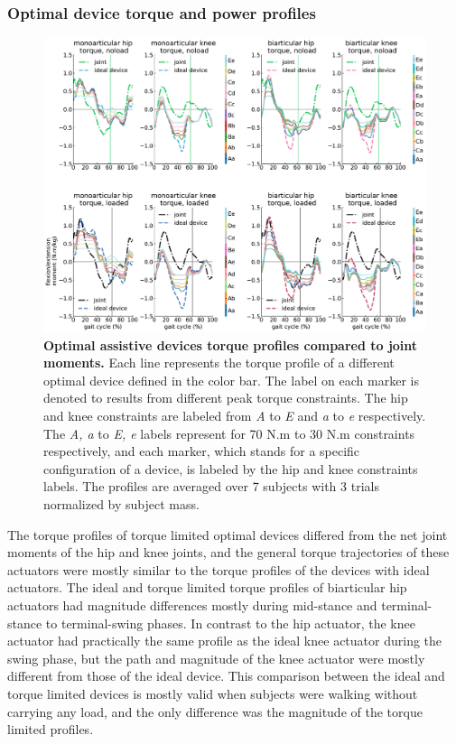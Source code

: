 \documentclass[10pt,letterpaper]{article}
\begin{document}
\subsubsection*{Optimal device torque and power profiles }
\begin{figure}[t!]   
	\centering
	\includegraphics[width=\linewidth]{Pareto_Simulations_Figures/PaperFigure_Paretofront_TorqueProfiles.pdf}
	\vspace{1mm}
	\caption{{\small\textbf{Optimal assistive devices torque profiles compared to joint moments.} Each line represents the torque profile of a different optimal device defined in the color bar. The label on each marker is denoted to results from different peak torque constraints. The hip and knee constraints are labeled from {\it A} to {\it E} and {\it a} to {\it e} respectively. The {\it A, a} to {\it E, e} labels represent for 70 N.m to 30 N.m constraints respectively, and each marker, which stands for a specific configuration of a device, is labeled by the hip and knee constraints labels. The profiles are averaged over 7 subjects with 3 trials normalized by subject mass.}}
	\label{Fig_Paretofronts_Torque_Profiles}
\end{figure}
The torque profiles of torque limited optimal devices differed from the net joint moments of the hip and knee joints, and the general torque trajectories of these actuators were mostly similar to the torque profiles of the devices with ideal actuators. The ideal and torque limited torque profiles of biarticular hip actuators had magnitude differences mostly during mid-stance and terminal-stance to terminal-swing phases. In contrast to the hip actuator, the knee actuator had practically the same profile as the ideal knee actuator during the swing phase, but the path and magnitude of the knee actuator were mostly different from those of the ideal device. This comparison between the ideal and torque limited devices is mostly valid when subjects were walking without carrying any load, and the only difference was the magnitude of the torque limited profiles.\\
\end{document}
